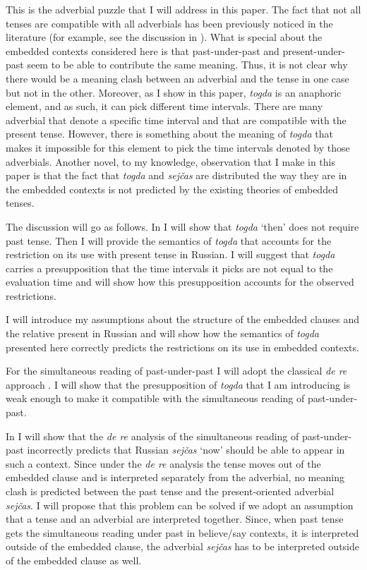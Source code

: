 \documentclass[output=paper,modfonts,newtxmath,hidelinks]{langscibook}
\begin{document}
\noindent This is the adverbial puzzle that I will address in this paper. The fact that not all tenses are compatible with all adverbials has been previously noticed in the literature (for example, see the discussion in \citealt{Hornstein1990}). What is special about the embedded contexts considered here is that past-under-past and present-under-past seem to be able to contribute the same meaning. Thus, it is not clear why there would be a meaning clash between an adverbial and the tense in one case but not in the other. Moreover, as I show in this paper, \textit{togda} is an anaphoric element, and as such, it can pick different time intervals. There are many adverbial that denote a specific time interval and that are compatible with the present tense. However, there is something about the meaning of \textit{togda} that makes it impossible for this element to pick the time intervals denoted by those adverbials. Another novel, to my knowledge, observation that I make in this paper is that the fact that \textit{togda} and \textit{sejčas} are distributed the way they are in the embedded contexts is not predicted by the existing theories of embedded tenses.

The discussion will go as follows. In  I will show that \textit{togda} ‘then’ does not require past tense. Then I will provide the semantics of \textit{togda} that accounts for the restriction on its use with present tense in Russian. I will suggest that \textit{togda} carries a presupposition that the time intervals it picks are not equal to the evaluation time and will show how this presupposition accounts for the observed restrictions.

I will introduce my assumptions about the structure of the embedded clauses and the relative present in Russian and will show how the semantics of \textit{togda} presented here correctly predicts the restrictions on its use in embedded contexts.

For the simultaneous reading of past-under-past I will adopt the classical \textit{de re} approach \citep{Abusch1997,Heim1994}. I will show that the presupposition of \textit{togda} that I am introducing is weak enough to make it compatible with the simultaneous reading of past-under-past.

In  I will show that the \textit{de re} analysis of the simultaneous reading of past-under-past incorrectly predicts that Russian \textit{sejčas} ‘now’ should be able to appear in such a context. Since under the \textit{de re} analysis the tense moves out of the embedded clause and is interpreted separately from the adverbial, no meaning clash is predicted between the past tense and the present-oriented adverbial \textit{sejčas}. I will propose that this problem can be solved if we adopt an assumption that a tense and an adverbial are interpreted together. Since, when past tense gets the simultaneous reading under past in believe/say contexts, it is interpreted outside of the embedded clause, the adverbial \textit{sejčas} has to be interpreted outside of the embedded clause as well.
\end{document}
